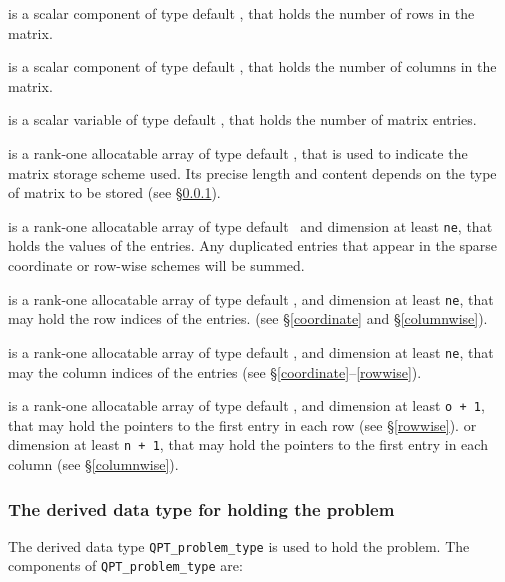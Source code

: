 \documentclass{galahad}
\begin{document}
\begin{description}

 is a scalar component of type default \integer,
that holds the number of rows in the matrix.

 is a scalar component of type default \integer,
that holds the number of columns in the matrix.

 is a scalar variable of type default \integer, that
holds the number of matrix entries.

 is a rank-one allocatable array of type default \character, that
is used to indicate the matrix storage scheme used. Its precise length and
content depends on the type of matrix to be stored (see \S\ref{typeprob}).

 is a rank-one allocatable array of type default \realdp\,
and dimension at least {\tt ne}, that holds the values of the entries.
Any duplicated entries that appear in the sparse
coordinate or row-wise schemes will be summed.

 is a rank-one allocatable array of type default \integer,
and dimension at least {\tt ne}, that may hold the row indices of the entries.
(see \S\ref{coordinate} and \S\ref{columnwise}).

 is a rank-one allocatable array of type default \integer,
and dimension at least {\tt ne}, that may the column indices of the entries
(see \S\ref{coordinate}--\ref{rowwise}).

 is a rank-one allocatable array of type default \integer,
and dimension at least {\tt o + 1}, that may hold the pointers to
the first entry in each row (see \S\ref{rowwise}).
or dimension at least {\tt n + 1}, that may hold the pointers to
the first entry in each column (see \S\ref{columnwise}).

\end{description}


\subsubsection{The derived data type for holding the problem}\label{typeprob}
The derived data type {\tt QPT\_problem\_type} is used to hold
the problem. The components of
{\tt QPT\_problem\_type}
are:
\end{document}
